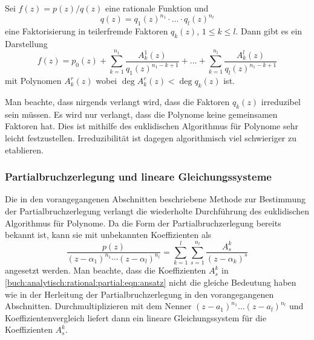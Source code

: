 \begin{satz}[Partialbruchzerlegung]
\label{buch:analytisch:rational:satz:partialbruchzerlegung}
Sei $f(z) = p(z)/q(z)$ eine rationale Funktion und 
\[
q(z)
=
q_1(z)^{n_1}
\cdot\ldots\cdot
q_l(z)^{n_l}
\]
eine Faktorisierung in teilerfremde Faktoren $q_k(z)$, $1\le k\le l$.
Dann gibt es ein Darstellung
\[
f(z)
=
p_0(z)
+
\sum_{k=1}^{n_1}
\frac{A_k^1(z)}{q_1(z)^{n_1-k+1}}
+
\ldots
+
\sum_{k=1}^{n_l}
\frac{A_k^l(z)}{q_l(z)^{n_1-k+1}}
\]
mit Polynomen $A_k^r(z)$
wobei $\deg A_k^r(z) < \deg q_k(z)$ ist.
\end{satz}

Man beachte, dass nirgends verlangt wird, dass die Faktoren 
$q_k(z)$ irreduzibel sein müssen.
Es wird nur verlangt, dass die Polynome keine gemeinsamen
Faktoren hat.
Dies ist mithilfe des euklidischen Algorithmus für Polynome
sehr leicht festzustellen.
Irreduzibilität ist dagegen algorithmisch viel schwieriger
zu etablieren.

%
%
\subsubsection{Partialbruchzerlegung und lineare Gleichungssysteme}
Die in den vorangegangenen Abschnitten beschriebene Methode zur
Bestimmung der Partialbruchzerlegung verlangt die wiederholte
Durchführung des euklidischen Algorithmus für Polynome.
Da die Form der Partialbruchzerlegung bereits bekannt ist,
kann sie mit unbekannten Koeffizienten als
\begin{equation}
\frac{p(z)}{(z-\alpha_1)^{n_1}\cdots(z-\alpha_l)^{n_l}}
=
\sum_{k=1}^l
\sum_{s=1}^{n_l}
\frac{A^k_s}{(z-\alpha_k)^s}
\label{buch:analytisch:rational:partial:eqn:ansatz}
\end{equation}
angesetzt werden.
Man beachte, dass die Koeffizienten $A^k_s$ in
\eqref{buch:analytisch:rational:partial:eqn:ansatz} nicht
die gleiche Bedeutung haben wie in der Herleitung der
Partialbruchzerlegung in den vorangegangenen Abschnitten.
Durchmultiplizieren mit dem Nenner $(z-a_1)^{n_1}\dots (z-a_l)^{n_l}$
und Koeffizientenvergleich liefert dann ein lineare Gleichungssystem
für die Koeffizienten $A^k_s$.
%

